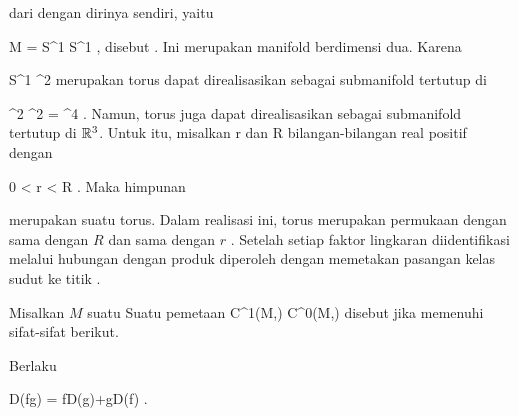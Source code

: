 {

dari
dengan dirinya sendiri, yaitu

\mavergleichskette
{\vergleichskette
{ M
}
{ = }{ S^1 \times S^1
}
{  }{
}
{    }{
}
{   }{
}
}
{}{}{,}
disebut  {.} Ini merupakan manifold berdimensi dua. Karena

\mavergleichskette
{\vergleichskette
{ S^1
}
{ \subset }{ \R^2
}
{  }{
}
{    }{
}
{   }{
}
}
{}{}{}
merupakan
torus dapat direalisasikan sebagai submanifold tertutup di

\mavergleichskette
{\vergleichskette
{ \R^2 \times \R^2
}
{ = }{ \R^4
}
{  }{
}
{    }{
}
{   }{
}
}
{}{}{.}
Namun, torus juga dapat direalisasikan sebagai submanifold tertutup di ${\mathbb R}^3$. Untuk itu, misalkan
\mathkor {} {r} {dan} {R} {}
bilangan-bilangan real positif dengan

\mavergleichskette
{\vergleichskette
{ 0
}
{ < }{ r
}
{ < }{ R
}
{    }{
}
{   }{
}
}
{}{}{.}
Maka himpunan

 {  }

merupakan suatu torus. Dalam realisasi ini, torus merupakan permukaan
 {} {}
 dengan  sama dengan $R$ dan  sama dengan $r$
 {} {.}
Setelah setiap faktor lingkaran diidentifikasi melalui
hubungan dengan produk
 diperoleh dengan memetakan pasangan kelas sudut
\mathl{([ \varphi ],[ \psi ])}{} ke titik
.

}


{}
{

Misalkan $M$ suatu
Suatu pemetaan
 {C^1(M,\R) } { C^0(M,\R)
} {}
disebut
jika memenuhi sifat-sifat berikut.
 {Berlaku

\mavergleichskette
{\vergleichskette
{ D(fg)
}
{ = }{ fD(g)+gD(f)
}
{  }{
}
{    }{
}
{   }{
}
}
{}{}{.}
}

}

